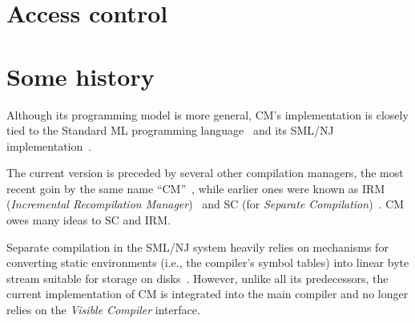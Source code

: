 \documentclass{article}
\begin{document}
\section{Access control}
\label{sec:access}

\section{Some history}

Although its programming model is more general, CM's implementation is
closely tied to the Standard ML programming language~\cite{milner97}
and its SML/NJ implementation~\cite{appel91:sml}.

The current version is preceded by several other compilation managers,
the most recent goin by the same name ``CM''~\cite{blume95:cm}, while
earlier ones were known as IRM ({\it Incremental Recompilation
Manager})~\cite{harper94:irm} and SC (for {\it Separate
Compilation})~\cite{harper-lee-pfenning-rollins-CM}.  CM owes many
ideas to SC and IRM.

Separate compilation in the SML/NJ system heavily relies on mechanisms
for converting static environments (i.e., the compiler's symbol
tables) into linear byte stream suitable for storage on
disks~\cite{appel94:sepcomp}.  However, unlike all its predecessors,
the current implementation of CM is integrated into the main compiler
and no longer relies on the {\em Visible Compiler} interface.

\cleardoublepage

\tableofcontents

\pagebreak


\end{document}
